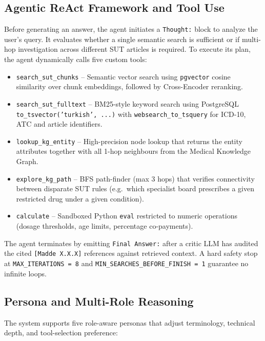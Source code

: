 \documentclass[11pt, a4paper]{article}
\begin{document}
\subsection{Agentic ReAct Framework and Tool Use}

Before generating an answer, the agent initiates a \texttt{Thought:} block to analyze the user's query. It evaluates whether a single semantic search is sufficient or if multi-hop investigation across different SUT articles is required. To execute its plan, the agent dynamically calls five custom tools:

\begin{itemize}[leftmargin=*]
    \item \texttt{search\_sut\_chunks} -- Semantic vector search using \texttt{pgvector} cosine similarity over chunk embeddings, followed by Cross-Encoder reranking.
    \item \texttt{search\_sut\_fulltext} -- BM25-style keyword search using PostgreSQL \texttt{to\_tsvector('turkish', ...)} with \texttt{websearch\_to\_tsquery} for ICD-10, ATC and article identifiers.
    \item \texttt{lookup\_kg\_entity} -- High-precision node lookup that returns the entity attributes together with all 1-hop neighbours from the Medical Knowledge Graph.
    \item \texttt{explore\_kg\_path} -- BFS path-finder (max 3 hops) that verifies connectivity between disparate SUT rules (e.g.\ which specialist board prescribes a given restricted drug under a given condition).
    \item \texttt{calculate} -- Sandboxed Python \texttt{eval} restricted to numeric operations (dosage thresholds, age limits, percentage co-payments).
\end{itemize}

The agent terminates by emitting \texttt{Final Answer:} after a critic LLM has audited the cited \texttt{[Madde X.X.X]} references against retrieved context. A hard safety stop at \texttt{MAX\_ITERATIONS = 8} and \texttt{MIN\_SEARCHES\_BEFORE\_FINISH = 1} guarantee no infinite loops.

\subsection{Persona and Multi-Role Reasoning}

The system supports five role-aware personas that adjust terminology, technical depth, and tool-selection preference:
\end{document}

